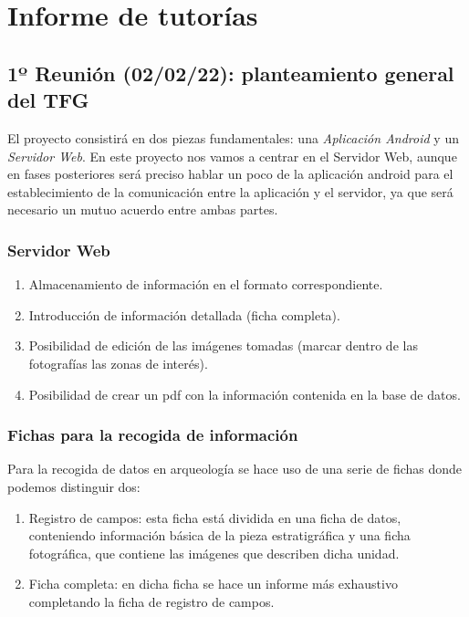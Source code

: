 \chapter{Informe de tutorías} \label{ch:meetings}
\section{1º Reunión (02/02/22): planteamiento general del TFG}
El proyecto consistirá en dos piezas fundamentales: una \textit{Aplicación Android} y un 
\textit{Servidor Web}. En este proyecto nos vamos a centrar en el Servidor Web, aunque en
fases posteriores será preciso hablar un poco de la aplicación android para el establecimiento
de la comunicación entre la aplicación y el servidor, ya que será necesario un mutuo acuerdo
entre ambas partes.

    \subsection{Servidor Web}

        \begin{enumerate}
            \item Almacenamiento de información en el formato correspondiente.
            \item Introducción de información detallada (ficha completa).
            \item Posibilidad de edición de las imágenes tomadas (marcar dentro de las
            fotografías las zonas de interés).
            \item Posibilidad de crear un pdf con la información contenida en la base de
            datos.
        \end{enumerate}

    \subsection{Fichas para la recogida de información}
    Para la recogida de datos en arqueología se hace uso de una serie de fichas donde podemos
    distinguir dos:

        \begin{enumerate}
            \item Registro de campos: esta ficha está dividida en una ficha de datos,
            conteniendo información básica de la pieza estratigráfica y una ficha fotográfica,
            que contiene las imágenes que describen dicha unidad.
            \item Ficha completa: en dicha ficha se hace un informe más exhaustivo completando
            la ficha de registro de campos.
        \end{enumerate}

